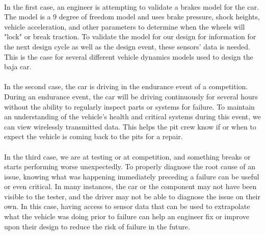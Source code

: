 \paragraph{}
In the first case, an engineer is attempting to validate a brakes model for the car.
The model is a 9 degree of freedom model and uses brake pressure, shock heights, vehicle acceleration, and other parameters to determine when the wheels will "lock" or break traction.
To validate the model for our design for information for the next design cycle as well as the design event, these sensors' data is needed.
This is the case for several different vehicle dynamics models used to design the baja car.

\paragraph{}
In the second case, the car is driving in the endurance event of a competition.
During an endurance event, the car will be driving continuously for several hours without the ability to regularly inspect parts or systems for failure.
To maintain an understanding of the vehicle's health and critical systems during this event, we can view wirelessly transmitted data.
This helps the pit crew know if or when to expect the vehicle is coming back to the pits for a repair.

\paragraph{}
In the third case, we are at testing or at competition, and something breaks or starts performing worse unexpectedly.
To properly diagnose the root cause of an issue, knowing what was happening immediately preceding a failure can be useful or even critical.
In many instances, the car or the component may not have been visible to the tester, and the driver may not be able to diagnose the issue on their own.
In this case, having access to sensor data that can be used to extrapolate what the vehicle was doing prior to failure can help an engineer fix or improve upon their design to reduce the risk of failure in the future.